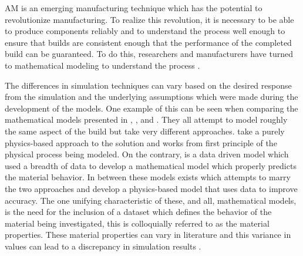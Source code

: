 \label{introAMsim}

\Acf{AM} is an emerging manufacturing technique which has the potential to revolutionize manufacturing.  To realize this revolution, it is necessary to be able to produce components reliably and to understand the process well enough to ensure that builds are consistent enough that the performance of the completed build can be guaranteed.  To do this, researchers and manufacturers have turned to mathematical modeling to understand the process \cite{wangClosedLoopHighFidelitySimulation2021}.

The differences in simulation techniques can vary based on the desired response from the simulation and the underlying assumptions which were made during the development of the models.
One example of this can be seen when comparing the mathematical models presented in \cite{wangClosedLoopHighFidelitySimulation2021}, \cite{royDatadrivenModelingThermal2020}, and \cite{mogesHYBRIDMODELINGAPPROACH2020}.  They all attempt to model roughly the same aspect of the build but take very different approaches.
\cite{wangClosedLoopHighFidelitySimulation2021} take a purely physics-based approach to the solution and works from first principle of the physical process being modeled.
On the contrary, \cite{royDatadrivenModelingThermal2020} is a data driven model which used a breadth of data to develop a mathematical model which properly predicts the material behavior. 
In between these models exists \cite{mogesHYBRIDMODELINGAPPROACH2020} which attempts to marry the two approaches and develop a physics-based model that uses data to improve accuracy.
The one unifying characteristic of these, and all, mathematical models, is the need for the inclusion of a dataset which defines the behavior of the material being investigated, this is colloquially referred to as the material properties.  These material properties can vary in literature and this variance in values can lead to a discrepancy in simulation results \cite{Daryabeigi2011}.

